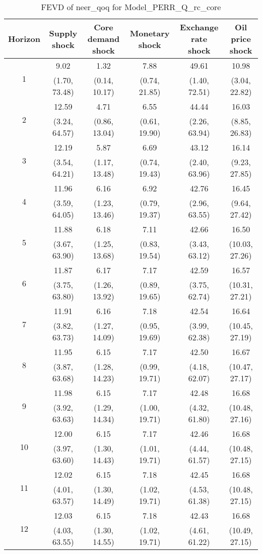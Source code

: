 \documentclass{article}
\begin{document}
\begin{table}
	\footnotesize
	\caption{FEVD of neer_qoq for Model_PERR_Q_rc_core}
	\begin{tabular}{cccccc}
		Horizon & Supply shock & Core demand shock & Monetary shock & Exchange rate shock & Oil price shock\\ \hline
		\multirow{2}{*}{1} & 9.02 & 1.32 & 7.88 & 49.61 & 10.98\\
		 & (1.70, 73.48) & (0.14, 10.17) & (0.74, 21.85) & (1.40, 72.51) & (3.04, 22.82)\\
		\multirow{2}{*}{2} & 12.59 & 4.71 & 6.55 & 44.44 & 16.03\\
		 & (3.24, 64.57) & (0.86, 13.04) & (0.61, 19.90) & (2.26, 63.94) & (8.85, 26.83)\\
		\multirow{2}{*}{3} & 12.19 & 5.87 & 6.69 & 43.12 & 16.14\\
		 & (3.54, 64.21) & (1.17, 13.48) & (0.74, 19.43) & (2.40, 63.96) & (9.23, 27.85)\\
		\multirow{2}{*}{4} & 11.96 & 6.16 & 6.92 & 42.76 & 16.45\\
		 & (3.59, 64.05) & (1.23, 13.46) & (0.79, 19.37) & (2.96, 63.55) & (9.64, 27.42)\\
		\multirow{2}{*}{5} & 11.88 & 6.18 & 7.11 & 42.66 & 16.50\\
		 & (3.67, 63.90) & (1.25, 13.68) & (0.83, 19.54) & (3.43, 63.12) & (10.03, 27.26)\\
		\multirow{2}{*}{6} & 11.87 & 6.17 & 7.17 & 42.59 & 16.57\\
		 & (3.75, 63.80) & (1.26, 13.92) & (0.89, 19.65) & (3.75, 62.74) & (10.31, 27.21)\\
		\multirow{2}{*}{7} & 11.91 & 6.16 & 7.18 & 42.54 & 16.64\\
		 & (3.82, 63.73) & (1.27, 14.09) & (0.95, 19.69) & (3.99, 62.38) & (10.45, 27.19)\\
		\multirow{2}{*}{8} & 11.95 & 6.15 & 7.17 & 42.50 & 16.67\\
		 & (3.87, 63.68) & (1.28, 14.23) & (0.99, 19.71) & (4.18, 62.07) & (10.47, 27.17)\\
		\multirow{2}{*}{9} & 11.98 & 6.15 & 7.17 & 42.48 & 16.68\\
		 & (3.92, 63.63) & (1.29, 14.34) & (1.00, 19.71) & (4.32, 61.80) & (10.48, 27.16)\\
		\multirow{2}{*}{10} & 12.00 & 6.15 & 7.17 & 42.46 & 16.68\\
		 & (3.97, 63.60) & (1.30, 14.43) & (1.01, 19.71) & (4.44, 61.57) & (10.48, 27.15)\\
		\multirow{2}{*}{11} & 12.02 & 6.15 & 7.18 & 42.45 & 16.68\\
		 & (4.01, 63.57) & (1.30, 14.49) & (1.02, 19.71) & (4.53, 61.38) & (10.48, 27.15)\\
		\multirow{2}{*}{12} & 12.03 & 6.15 & 7.18 & 42.43 & 16.68\\
		 & (4.03, 63.55) & (1.30, 14.55) & (1.02, 19.71) & (4.61, 61.22) & (10.49, 27.15)\\
	\end{tabular}
\label{tab:fevd-Model_PERR_Q_rc_core-neer_qoq}
\end{table}
\end{document}
